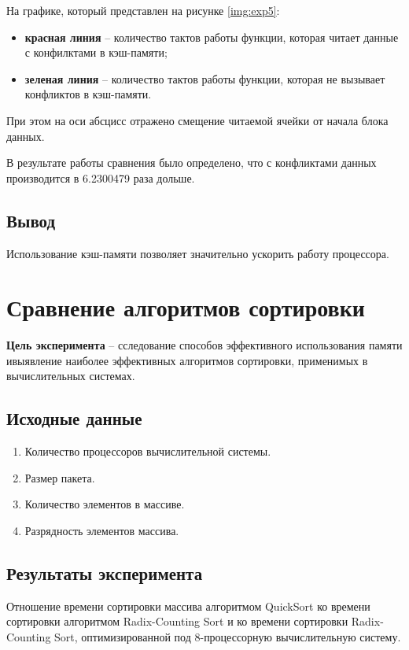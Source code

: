 На графике, который представлен на рисунке \ref{img:exp5}:
\begin{itemize}
	\item \textbf{красная линия} -- количество тактов работы функции, которая читает данные с конфилктами в кэш-памяти;
	\item \textbf{зеленая линия} -- количество тактов работы функции, которая не вызывает конфликтов в кэш-памяти.
\end{itemize}

При этом на оси абсцисс отражено смещение читаемой ячейки от начала блока данных.



\clearpage


В результате работы сравнения было определено, что с конфликтами данных производится в 6.2300479 раза дольше.



\subsection{Вывод}

Использование кэш-памяти позволяет значительно ускорить работу процессора.




\section{Сравнение алгоритмов сортировки}

\textbf{Цель эксперимента} -- сследование способов эффективного использования  памяти ивыявление наиболее эффективных алгоритмов сортировки, применимых в вычислительных системах.

\subsection{Исходные данные}
\begin{enumerate}
	\item Количество процессоров вычислительной системы.
	\item Размер пакета.
	\item Количество элементов в массиве.
	\item Разрядность элементов массива.
\end{enumerate}

\subsection{Результаты эксперимента}
Отношение времени сортировки массива алгоритмом QuickSort ко времени сортировки алгоритмом Radix-Counting Sort  и ко времени сортировки Radix-Counting Sort, оптимизированной под 8-процессорную вычислительную систему.


